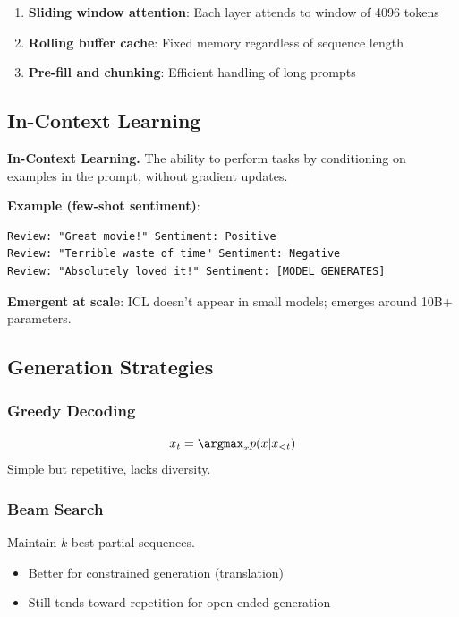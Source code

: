 \begin{enumerate}
    \item \textbf{Sliding window attention}: Each layer attends to window of 4096 tokens
    \item \textbf{Rolling buffer cache}: Fixed memory regardless of sequence length
    \item \textbf{Pre-fill and chunking}: Efficient handling of long prompts
\end{enumerate}

\subsection{In-Context Learning}

\textbf{In-Context Learning.} The ability to perform tasks by conditioning on examples in the prompt, without gradient updates.

\textbf{Example (few-shot sentiment)}:
\begin{verbatim}
Review: "Great movie!" Sentiment: Positive
Review: "Terrible waste of time" Sentiment: Negative
Review: "Absolutely loved it!" Sentiment: [MODEL GENERATES]
\end{verbatim}

\textbf{Emergent at scale}: ICL doesn't appear in small models; emerges around 10B+ parameters.

\subsection{Generation Strategies}

\subsubsection{Greedy Decoding}
\begin{equation}
x_t = \argmax_x p(x | x_{<t})
\end{equation}
Simple but repetitive, lacks diversity.

\subsubsection{Beam Search}
Maintain $k$ best partial sequences.
\begin{itemize}
    \item Better for constrained generation (translation)
    \item Still tends toward repetition for open-ended generation
\end{itemize}

